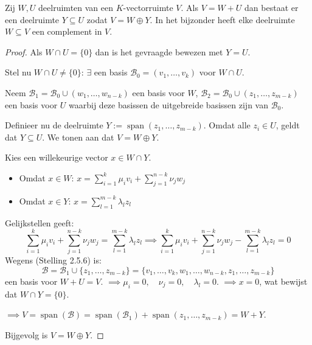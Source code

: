 \begin{lemma}[2.5.8]
    Zij $W, U$ deelruimten van een $K$-vectorruimte $V$. Als $V = W + U$ dan bestaat er een deelruimte $Y \subseteq U$ zodat $V = W \oplus Y$. 
    In het bijzonder heeft elke deelruimte $W \subseteq V$ een complement in $V$.
\end{lemma}
\begin{proof}
    Als \(W \cap U = \{0\}\) dan is het gevraagde bewezen met \(Y = U\).

    Stel nu \(W \cap U \neq \{0\}\):
    \(\exists\) een basis \(\mathcal{B}_0 = (v_1,\dots,v_k)\) voor \(W \cap U\).

    Neem \(\mathcal{B}_1 = \mathcal{B}_0 \cup (w_1,\dots,w_{n-k}) \) een basis voor \(W\), \(\mathcal{B}_2 = \mathcal{B}_0 \cup (z_1,\dots,z_{m-k}) \) een basis voor \(U\) waarbij deze basissen de uitgebreide basissen zijn van \(\mathcal{B}_0\).

    Definieer nu de deelruimte $Y := \operatorname{span}(z_1, \dots, z_{m-k})$. 
    Omdat alle $z_i \in U$, geldt dat $Y \subseteq U$. We tonen aan dat $V = W \oplus Y$.

    Kies een willekeurige vector $x \in W \cap Y$.
    \begin{itemize}
        \item Omdat $x \in W$:
        \(x = \sum_{i=1}^{k} \mu_i v_i + \sum_{j=1}^{n-k} \nu_j w_j \)
        \item Omdat $x \in Y$:
        \( x = \sum_{l=1}^{m-k} \lambda_l z_l \)
    \end{itemize}
    Gelijkstellen geeft:
    \[ \sum_{i=1}^{k} \mu_i v_i + \sum_{j=1}^{n-k} \nu_j w_j = \sum_{l=1}^{m-k} \lambda_l z_l \implies \sum_{i=1}^{k} \mu_i v_i + \sum_{j=1}^{n-k} \nu_j w_j - \sum_{l=1}^{m-k} \lambda_l z_l = 0 \]
    Wegens (Stelling 2.5.6) is:
    \[ \mathcal{B} = \mathcal{B}_1 \cup \{z_1, \dots, z_{m-k}\} = \{v_1, \dots, v_k, w_1, \dots, w_{n-k}, z_1, \dots, z_{m-k}\} \]
    een basis voor $W + U = V$. 
    \( \implies \mu_i = 0, \quad \nu_j = 0, \quad \lambda_l = 0 \).
    $\implies x = 0$, wat bewijst dat $W \cap Y = \{0\}$.

    \(\implies V = \operatorname{span}(\mathcal{B}) = \operatorname{span}(\mathcal{B}_1) + \operatorname{span}(z_1, \dots, z_{m-k}) = W + Y \).
    
    Bijgevolg is \(V = W \oplus Y\).
\end{proof}

